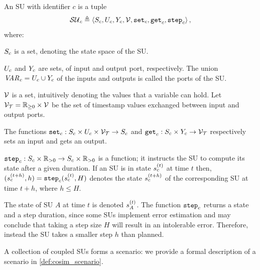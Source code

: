 \begin{definition}\label{def:fmu}
  An SU with identifier $c$ is a tuple
  $$\mathcal{SU}_c \triangleq  \left\langle S_{c}, U_{c}, Y_{c}, \mathcal{V}, \mathtt{set}_{c}, \mathtt{get}_{c}, \mathtt{step}_{c} \right\rangle ,$$
  where:
  \begin{compactitem}
    \item $S_{c}$ is a set, denoting the state space of the SU.
    \item $U_{c}$ and $Y_{c}$ are sets, of input and output port, respectively.
    The union $\mathit{VAR_{c}} = U_{c} \cup Y_{c}$ of the inputs and outputs is called the ports of the SU.
    \item $\mathcal{V}$ is a set, intuitively denoting the values that a variable can hold.
    Let $\mathcal{V_{T}} = \mathbb{R}_{\geq 0} \times \mathcal{V}$ be the set of timestamp values exchanged between input and output ports.
    \item 
    The functions
    $\mathtt{set}_{c} : S_{c} \times U_{c} \times \mathcal{V_{T}} \to S_{c}$ and $\mathtt{get}_{c}: S_{c} \times Y_{c} \to \mathcal{V_{T}}$ respectively sets an input and gets an output. 
    \item $\mathtt{step}_{c}: S_{c} \times \mathbb{R}_{> 0} \to S_{c} \times \mathbb{R}_{> 0} $ is a function; it instructs the SU to compute its state after a given duration. 
    If an SU is in state $s_{c}^{(t)}$ at time $t$ then, $(s_{c}^{(t+h)}, h) = \mathtt{step}_{c}(s_{c}^{(t)}, H)$ denotes the state $s_{c}^{(t+h)}$ of the corresponding SU at time $t+h$, where $h \leq H$. 
  \end{compactitem}
\end{definition}

The state of SU $A$ at time $t$ is denoted $s_{A}^{(t)}$.
The function $\mathtt{step}_{c}$ returns a state and a step duration, since some SUs implement error estimation and may conclude that taking a step size $H$ will result in an intolerable error.
Therefore, instead the SU takes a smaller step $h$ than planned.

A collection of coupled SUs forms a scenario:
we provide a formal description of a scenario in \cref{def:cosim_scenario}.

